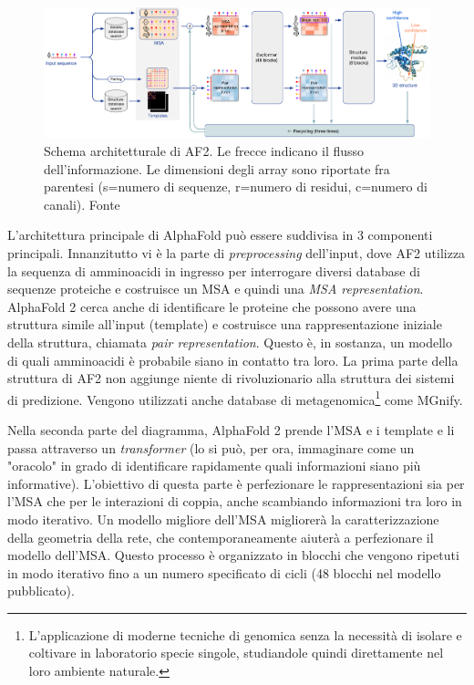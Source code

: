 \begin{figure}[!htb]
	\centering
	\includegraphics[scale=0.38]{images/af-archit.png}
	\caption{Schema architetturale di AF2. Le frecce indicano il flusso dell'informazione. Le dimensioni degli array sono riportate fra parentesi (s=numero di sequenze, r=numero di residui, c=numero di canali). Fonte\cite{jumper2021highly}}
	\label{fig:architettura-af2}
\end{figure}

L'architettura principale di AlphaFold può essere suddivisa in 3 componenti principali. Innanzitutto vi è la parte di \textit{preprocessing} dell'input, dove AF2 utilizza la sequenza di amminoacidi in ingresso per interrogare diversi database di sequenze proteiche e costruisce un MSA e quindi una \textit{MSA representation}. AlphaFold 2 cerca anche di identificare le proteine che possono avere una struttura simile all'input (template) e costruisce una rappresentazione iniziale della struttura, chiamata \textit{pair representation}. Questo è, in sostanza, un modello di quali amminoacidi è probabile siano in contatto tra loro. La prima parte della struttura di AF2 non aggiunge niente di rivoluzionario alla struttura dei sistemi di predizione. Vengono utilizzati anche database di metagenomica\footnote{L'applicazione di moderne tecniche di genomica senza la necessità di isolare e coltivare in laboratorio specie singole, studiandole quindi direttamente nel loro ambiente naturale.} come MGnify.

\par Nella seconda parte del diagramma, AlphaFold 2 prende l'MSA e i template e li passa attraverso un \textit{transformer} (lo si può, per ora, immaginare come un "oracolo" in grado di identificare rapidamente quali informazioni siano più informative). L'obiettivo di questa parte è perfezionare le rappresentazioni sia per l'MSA che per le interazioni di coppia, anche scambiando informazioni tra loro in modo iterativo. Un modello migliore dell'MSA migliorerà la caratterizzazione della geometria della rete, che contemporaneamente aiuterà a perfezionare il modello dell'MSA. Questo processo è organizzato in blocchi che vengono ripetuti in modo iterativo fino a un numero specificato di cicli (48 blocchi nel modello pubblicato).

